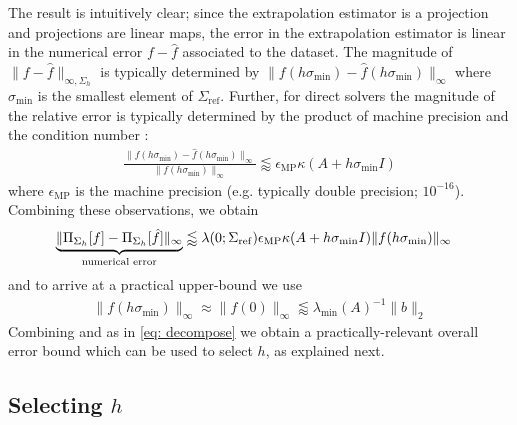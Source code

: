 \documentclass[10pt]{article} %
\newcommand{\nugget}{\sigma}
\newcommand{\nuggets}{\Sigma}
\begin{document}
\noindent The result is intuitively clear; since the extrapolation estimator is a projection and projections are linear maps, the error in the extrapolation estimator is linear in the numerical error $f - \hat{f}$ associated to the dataset.
The magnitude of $\|f - \hat{f} \|_{\infty, \nuggets_h}$ is typically determined by $\|f(h \nugget_{\min}) - \hat{f}(h \nugget_{\min}) \|_\infty$ where $\nugget_{\min}$ is the smallest element of $\nuggets_{\mathrm{ref}}$.
Further, for direct solvers the magnitude of the relative error is typically determined by the product of machine precision and the condition number \citep{weiss1986average}:
\begin{align}
\frac{ \|f(h\nugget_{\min}) - \hat{f}(h\nugget_{\min})\|_{\infty} }{ \|f(h\nugget_{\min})\|_\infty } \lessapprox \epsilon_{\mathrm{MP}} \kappa(A + h\nugget_{\min} I)   \label{eq: er bd}
\end{align}
where $\epsilon_{\mathrm{MP}}$ is the machine precision (e.g. typically double precision; $10^{-16}$).
Combining these observations, we obtain
\begin{align}
&\underbrace{ \| \Pi_{\nuggets_h}[f] - \Pi_{\nuggets_h}[\hat{f}] \|_\infty }_{\text{\normalfont numerical error}} \lessapprox \lambda(0;\nuggets_{\mathrm{ref}}) \epsilon_{\mathrm{MP}} \kappa(A + h \nugget_{\min} I) \|f(h \nugget_{\min})\|_\infty  \label{eq: num er 1}
\end{align}
and to arrive at a practical upper-bound we use 
\begin{align}
\|f(h \nugget_{\min})\|_\infty \approx \|f(0)\|_\infty \lessapprox \lambda_{\min}(A)^{-1} \|b\|_2 \label{eq: num er 2}
\end{align}
Combining  and  as in \eqref{eq: decompose} we obtain a practically-relevant overall error bound which can be used to select $h$, as explained next.









\subsection{Selecting \texorpdfstring{$h$}{h}}
\label{sec: select h}
\end{document}
